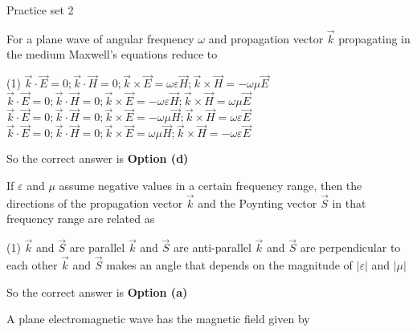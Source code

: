 \newpage
\begin{abox}
	Practice set 2 
\end{abox}
\begin{enumerate}
	\begin{minipage}{\textwidth}
		\item For a plane wave of angular frequency $\omega$ and propagation vector $\vec{k}$ propagating in the medium Maxwell's equations reduce to
	\end{minipage}
	\begin{tasks}(1)
		\task[\textbf{a.}] $\vec{k} \cdot \vec{E}=0 ; \vec{k} \cdot \vec{H}=0 ; \vec{k} \times \vec{E}=\omega \varepsilon \vec{H} ; \vec{k} \times \vec{H}=-\omega \mu \vec{E}$ 
		\task[\textbf{b.}]$\vec{k} \cdot \vec{E}=0 ; \vec{k} \cdot \vec{H}=0 ; \vec{k} \times \vec{E}=-\omega \varepsilon \vec{H} ; \vec{k} \times \vec{H}=\omega \mu \vec{E}$
		\task[\textbf{c.}]$\vec{k} \cdot \vec{E}=0 ; \vec{k} \cdot \vec{H}=0 ; \vec{k} \times \vec{E}=-\omega \mu \vec{H} ; \vec{k} \times \vec{H}=\omega \varepsilon \vec{E}$
		\task[\textbf{d.}]$\vec{k} \cdot \vec{E}=0 ; \vec{k} \cdot \vec{H}=0 ; \vec{k} \times \vec{E}=\omega \mu \vec{H} ; \vec{k} \times \vec{H}=-\omega \varepsilon \vec{E}$
	\end{tasks}
\begin{answer}
	So the correct answer is \textbf{Option (d)}
\end{answer}
	\begin{minipage}{\textwidth}
		\item If $\varepsilon$ and $\mu$ assume negative values in a certain frequency range, then the directions of the propagation vector $\vec{k}$ and the Poynting vector $\vec{S}$ in that frequency range are related as
	\end{minipage}
	\begin{tasks}(1)
		\task[\textbf{a.}] $\vec{k}$ and $\vec{S}$ are parallel
		\task[\textbf{b.}]$\vec{k}$ and $\vec{S}$ are anti-parallel
		\task[\textbf{c.}]$\vec{k}$ and $\vec{S}$ are perpendicular to each other
		\task[\textbf{d.}]$\vec{k}$ and $\vec{S}$ makes an angle that depends on the magnitude of $|\varepsilon|$ and $|\mu|$
	\end{tasks}
\begin{answer}
	So the correct answer is \textbf{Option (a)}
\end{answer}
	\begin{minipage}{\textwidth}
		\item A plane electromagnetic wave has the magnetic field given by

\end{minipage}
\end{enumerate}
